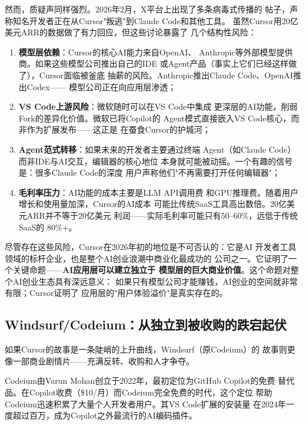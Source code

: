 \begin{warnbox}
然而，质疑声同样强烈。2026年2月，X平台上出现了多条病毒式传播的
帖子，声称知名开发者正在从Cursor"叛逃"到Claude Code和其他工具。
虽然Cursor用20亿美元ARR的数据做了有力回应，但这些讨论暴露了
几个结构性风险：
\begin{enumerate}
  \item \textbf{模型层依赖}：Cursor的核心AI能力来自OpenAI、
    Anthropic等外部模型提供商。如果这些模型公司推出自己的IDE
    或Agent产品（事实上它们已经这样做了），Cursor面临被釜底
    抽薪的风险。Anthropic推出Claude Code、OpenAI推出Codex——
    模型公司正在向应用层渗透；
  \item \textbf{VS Code上游风险}：微软随时可以在VS Code中集成
    更深层的AI功能，削弱Fork的差异化价值。微软已将Copilot的
    Agent模式直接嵌入VS Code核心，而非作为扩展发布——这正是
    在蚕食Cursor的护城河；
  \item \textbf{Agent范式转移}：如果未来的开发者主要通过终端
    Agent（如Claude Code）而非IDE与AI交互，编辑器的核心地位
    本身就可能被动摇。一个有趣的信号是：很多Claude Code的深度
    用户声称他们"不再需要打开任何编辑器"；
  \item \textbf{毛利率压力}：AI功能的成本主要是LLM API调用费
    和GPU推理费。随着用户增长和使用量加深，Cursor的AI成本
    可能比传统SaaS工具高出数倍。20亿美元ARR并不等于20亿美元
    利润——实际毛利率可能只有50--60\%，远低于传统SaaS的
    80\%+。
\end{enumerate}
\end{warnbox}

尽管存在这些风险，Cursor在2026年初的地位是不可否认的：它是AI
开发者工具领域的标杆企业，也是整个AI创业浪潮中商业化最成功的
公司之一。它证明了一个关键命题——\textbf{AI应用层可以建立独立于
模型层的巨大商业价值}。这个命题对整个AI创业生态具有深远意义：
如果只有模型公司才能赚钱，AI创业的空间就非常有限；Cursor证明了
应用层的"用户体验溢价"是真实存在的。

\subsection{Windsurf/Codeium：从独立到被收购的跌宕起伏}
\label{subsec:windsurf}

如果Cursor的故事是一条陡峭的上升曲线，Windsurf（原Codeium）的
故事则更像一部商业剧情片——充满反转、收购和人才争夺。

Codeium由Varun Mohan创立于2022年，最初定位为GitHub Copilot的免费
替代品。在Copilot收费（\$10/月）而Codeium完全免费的时代，这个定位
帮助Codeium迅速积累了大量个人开发者用户。其VS Code扩展的安装量
在2024年一度超过百万，成为Copilot之外最流行的AI编码插件。

